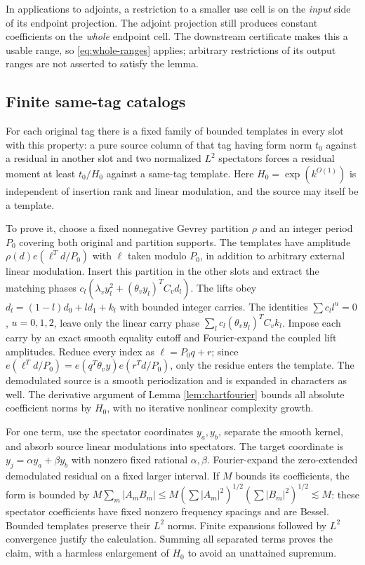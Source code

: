 \documentclass[11pt]{article}
\theoremstyle{definition}
\numberwithin{equation}{section}
\begin{document}
In applications to adjoints, a restriction to a smaller use cell is on the \emph{input} side of its endpoint projection. The adjoint projection still produces constant coefficients on the \emph{whole} endpoint cell. The downstream certificate makes this a usable range, so \eqref{eq:whole-ranges} applies; arbitrary restrictions of its output ranges are not asserted to satisfy the lemma.

\subsection{Finite same-tag catalogs}
For each original tag there is a fixed family of bounded templates in every slot with this property: a pure source column of that tag having form norm $t_0$ against a residual in another slot and two normalized $L^2$ spectators forces a residual moment at least $t_0/H_0$ against a same-tag template. Here $H_0=\exp(k^{O(1)})$ is independent of insertion rank and linear modulation, and the source may itself be a template.

To prove it, choose a fixed nonnegative Gevrey partition $\rho$ and an integer period $P_0$ covering both original and partition supports. The templates have amplitude $\rho(d)e(\ell^Td/P_0)$ with $\ell$ taken modulo $P_0$, in addition to arbitrary external linear modulation. Insert this partition in the other slots and extract the matching phases $c_l(\lambda_vy_l^2+(\theta_vy_l)^TC_vd_l)$. The lifts obey $d_l=(1-l)d_0+ld_1+k_l$ with bounded integer carries. The identities $\sum c_ll^u=0$, $u=0,1,2$, leave only the linear carry phase $\sum_lc_l(\theta_vy_l)^TC_vk_l$. Impose each carry by an exact smooth equality cutoff and Fourier-expand the coupled lift amplitudes. Reduce every index as $\ell=P_0q+r$; since $e(\ell^Td/P_0)=e(q^T\theta_vy)e(r^Td/P_0)$, only the residue enters the template. The demodulated source is a smooth periodization and is expanded in characters as well. The derivative argument of Lemma \ref{lem:chartfourier} bounds all absolute coefficient norms by $H_0$, with no iterative nonlinear complexity growth.

For one term, use the spectator coordinates $y_a,y_b$, separate the smooth kernel, and absorb source linear modulations into spectators. The target coordinate is $y_j=\alpha y_a+\beta y_b$ with nonzero fixed rational $\alpha,\beta$. Fourier-expand the zero-extended demodulated residual on a fixed larger interval. If $M$ bounds its coefficients, the form is bounded by $M\sum_m|A_mB_m|\le M(\sum|A_m|^2)^{1/2}(\sum|B_m|^2)^{1/2}\lesssim M$: these spectator coefficients have fixed nonzero frequency spacings and are Bessel. Bounded templates preserve their $L^2$ norms. Finite expansions followed by $L^2$ convergence justify the calculation. Summing all separated terms proves the claim, with a harmless enlargement of $H_0$ to avoid an unattained supremum.
\end{document}
